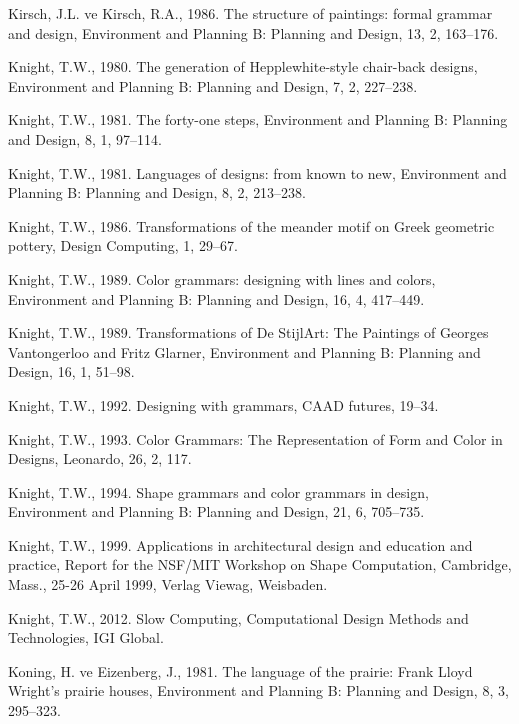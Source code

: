 \documentclass[12pt,turkish,a4paperpaper,]{report}
\begin{document}
\leavevmode\hypertarget{ref-Kirsch:1986bi}{}%
Kirsch, J.L. ve Kirsch, R.A., 1986. The structure of paintings: formal
grammar and design, Environment and Planning B: Planning and Design, 13,
2, 163--176.

\leavevmode\hypertarget{ref-Knight:1980cl}{}%
Knight, T.W., 1980. The generation of Hepplewhite-style chair-back
designs, Environment and Planning B: Planning and Design, 7, 2,
227--238.

\leavevmode\hypertarget{ref-Knight:1981gp}{}%
Knight, T.W., 1981. The forty-one steps, Environment and Planning B:
Planning and Design, 8, 1, 97--114.

\leavevmode\hypertarget{ref-Knight:1981ky}{}%
Knight, T.W., 1981. Languages of designs: from known to new, Environment
and Planning B: Planning and Design, 8, 2, 213--238.

\leavevmode\hypertarget{ref-Knight:1986wu}{}%
Knight, T.W., 1986. Transformations of the meander motif on Greek
geometric pottery, Design Computing, 1, 29--67.

\leavevmode\hypertarget{ref-Knight:1989ex}{}%
Knight, T.W., 1989. Color grammars: designing with lines and colors,
Environment and Planning B: Planning and Design, 16, 4, 417--449.

\leavevmode\hypertarget{ref-Knight:1989ec}{}%
Knight, T.W., 1989. Transformations of De StijlArt: The Paintings of
Georges Vantongerloo and Fritz Glarner, Environment and Planning B:
Planning and Design, 16, 1, 51--98.

\leavevmode\hypertarget{ref-Knight:1992tp}{}%
Knight, T.W., 1992. Designing with grammars, CAAD futures, 19--34.

\leavevmode\hypertarget{ref-Knight:1993jka}{}%
Knight, T.W., 1993. Color Grammars: The Representation of Form and Color
in Designs, Leonardo, 26, 2, 117.

\leavevmode\hypertarget{ref-Knight:1994hx}{}%
Knight, T.W., 1994. Shape grammars and color grammars in design,
Environment and Planning B: Planning and Design, 21, 6, 705--735.

\leavevmode\hypertarget{ref-Knight:1999uf}{}%
Knight, T.W., 1999. Applications in architectural design and education
and practice, Report for the NSF/MIT Workshop on Shape Computation,
Cambridge, Mass., 25-26 April 1999, Verlag Viewag, Weisbaden.

\leavevmode\hypertarget{ref-Knight:2012ue}{}%
Knight, T.W., 2012. Slow Computing, Computational Design Methods and
Technologies, IGI Global.

\leavevmode\hypertarget{ref-Koning:1981bd}{}%
Koning, H. ve Eizenberg, J., 1981. The language of the prairie: Frank
Lloyd Wright's prairie houses, Environment and Planning B: Planning and
Design, 8, 3, 295--323.
\end{document}

